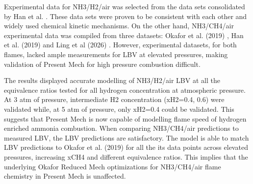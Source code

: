 \documentclass[10pt,twocolumn]{icfd2026paper}
\begin{document}
Experimental data for NH3/H2/air was selected from the data sets consolidated by Han et al. \cite{hannovel2026}. These
data sets were proven to be consistent with each other and widely used chemical kinetic mechanisms. On the other hand,
NH3/CH4/air experimental data was compiled from three datasets: Okafor et al. (2019) \cite{okaforMeasurement2019}, Han
et al. (2019) \cite{hanExperimental2019} and Ling et al (2026) \cite{lingExperimental2026}. However, experimental
datasets, for both flames, lacked ample measurements for LBV at elevated pressures, making validation of Present Mech for
high pressure combustion difficult.

The results displayed accurate modelling of NH3/H2/air LBV at all the equivalence ratios tested for all hydrogen
concentration at atmospheric pressure. At 3 atm of pressure, intermediate H2 concentration (xH2=0.4, 0.6) were validated
while, at 5 atm of pressure, only xH2=0.4 could be validated. This suggests that Present Mech is now capable of
modelling flame speed of hydrogen enriched ammonia combustion. When comparing NH3/CH4/air predictions to measured LBV,
the LBV predictions are satisfactory. The model is able to match LBV predictions to Okafor et al. (2019)
\cite{okaforMeasurement2019} for all the its data points across elevated pressures, increasing xCH4 and different
equivalence ratios. This implies that the underlying Okafor Reduced Mech optimizations for NH3/CH4/air flame chemistry in
Present Mech is unaffected.


\printbibliography
\end{document}
